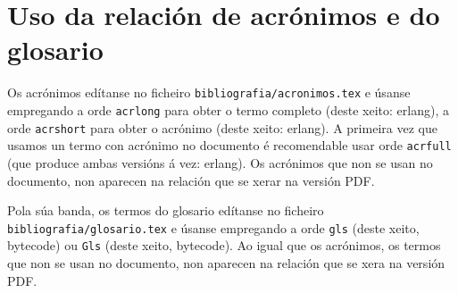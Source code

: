 \section{Uso da relación de acrónimos e do glosario}

Os acrónimos edítanse no ficheiro \texttt{bibliografia/acronimos.tex}
e úsanse empregando a orde \texttt{acrlong} para obter o termo
completo (deste xeito: \acrlong{erlang}), a orde \texttt{acrshort}
para obter o acrónimo (deste xeito: \acrshort{erlang}). A primeira vez
que usamos un termo con acrónimo no documento é recomendable usar orde
\texttt{acrfull} (que produce ambas versións á vez:
\acrfull{erlang}). Os acrónimos que non se usan no documento, non
aparecen na relación que se xerar na versión PDF.

Pola súa banda, os termos do glosario edítanse no ficheiro
\texttt{bibliografia/glo\-sa\-rio.tex} e úsanse empregando a orde
\texttt{gls} (deste xeito, \gls{bytecode}) ou \texttt{Gls} (deste
xeito, \Gls{bytecode}). Ao igual que os acrónimos, os termos que non
se usan no documento, non aparecen na relación que se xera na versión
PDF.
